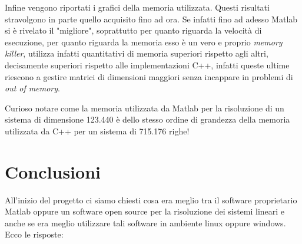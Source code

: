 \documentclass[preprint,12pt]{elsarticle}
\begin{document}
Infine vengono riportati i grafici della memoria utilizzata. Questi risultati stravolgono in parte quello acquisito fino ad ora.
Se infatti fino ad adesso Matlab si è rivelato il "migliore", soprattutto per quanto riguarda la velocità di esecuzione, per quanto riguarda la memoria esso è un vero e proprio \textit{memory killer}, utilizza infatti quantitativi di memoria superiori rispetto agli altri, decisamente superiori rispetto alle implementazioni C++, infatti queste ultime riescono a gestire matrici di dimensioni maggiori senza incappare in problemi di \textit{out of memory}.

Curioso notare come la memoria utilizzata da Matlab per la risoluzione di un sistema di dimensione 123.440 è dello stesso ordine di grandezza della memoria utilizzata da C++ per un sistema di 715.176 righe!

\section*{Conclusioni}
All'inizio del progetto ci siamo chiesti cosa era meglio tra il software proprietario Matlab oppure un software open source per la risoluzione dei sistemi lineari e anche se era meglio utilizzare tali software in ambiente linux oppure windows. Ecco le risposte:
\end{document}
